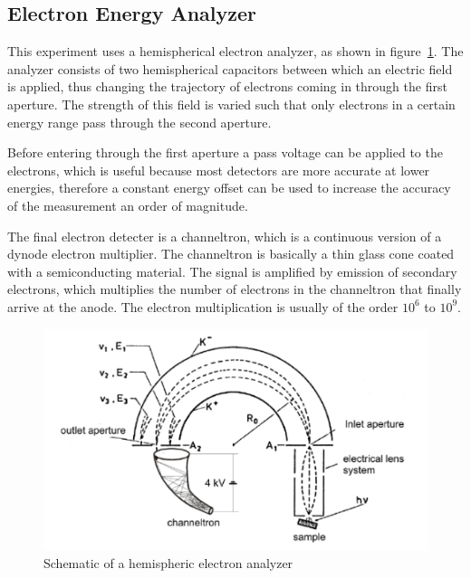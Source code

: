 \documentclass[a4paper,10pt]{scrartcl}
\begin{document}
\subsection{Electron Energy Analyzer}

This experiment uses a hemispherical electron analyzer, as shown in figure~\ref{fig:analyzer}. The analyzer consists of two hemispherical capacitors between which an electric field is applied, thus changing the trajectory of electrons coming in through the first aperture. The strength of this field is varied such that only electrons in a certain energy range pass through the second aperture.

Before entering through the first aperture a pass voltage can be applied to the electrons, which is useful because most detectors are more accurate at lower energies, therefore a constant energy offset can be used to increase the accuracy of the measurement an order of magnitude.

The final electron detecter is a channeltron, which is a  continuous version of a dynode electron multiplier. The channeltron is basically a thin glass cone coated with a semiconducting material. The signal is amplified by emission of secondary electrons, which multiplies the number of electrons in the channeltron that finally arrive at the anode. The electron multiplication is usually of the order $10^6$ to $10^9$.

\begin{figure}
\centering
\includegraphics[scale=0.4]{img/analyzer}
\caption{Schematic of a hemispheric electron analyzer \label{fig:analyzer}}
\end{figure}
\end{document}
